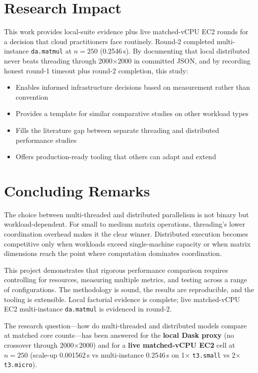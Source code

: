 \section{Research Impact}

This work provides local-suite evidence plus live matched-vCPU EC2 rounds for a decision that cloud practitioners face routinely. Round-2 completed multi-instance \texttt{da.matmul} at $n{=}250$ (0.2546\,s). By documenting that local distributed never beats threading through 2000×2000 in committed JSON, and by recording honest round-1 timeout plus round-2 completion, this study:

\begin{itemize}
    \item Enables informed infrastructure decisions based on measurement rather than convention
    \item Provides a template for similar comparative studies on other workload types
    \item Fills the literature gap between separate threading and distributed performance studies
    \item Offers production-ready tooling that others can adapt and extend
\end{itemize}

\section{Concluding Remarks}

The choice between multi-threaded and distributed parallelism is not binary but workload-dependent. For small to medium matrix operations, threading's lower coordination overhead makes it the clear winner. Distributed execution becomes competitive only when workloads exceed single-machine capacity or when matrix dimensions reach the point where computation dominates coordination.

This project demonstrates that rigorous performance comparison requires controlling for resources, measuring multiple metrics, and testing across a range of configurations. The methodology is sound, the results are reproducible, and the tooling is extensible. Local factorial evidence is complete; live matched-vCPU EC2 multi-instance \texttt{da.matmul} is evidenced in round-2.

The research question—how do multi-threaded and distributed models compare at matched core counts—has been answered for the \textbf{local Dask proxy} (no crossover through 2000×2000) and for a \textbf{live matched-vCPU EC2} cell at $n{=}250$ (scale-up 0.001562\,s vs multi-instance 0.2546\,s on 1× \texttt{t3.small} vs 2× \texttt{t3.micro}).
